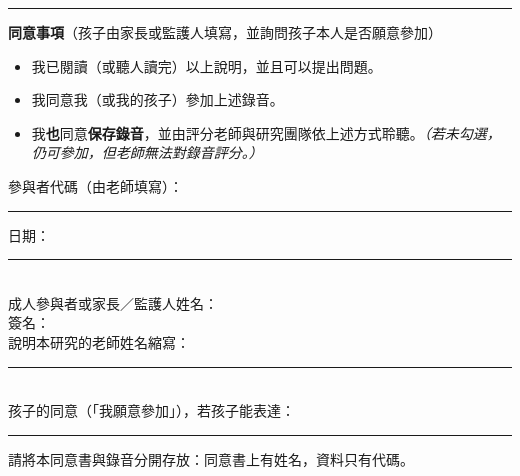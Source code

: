 \documentclass[11pt,a4paper]{article}
\begin{document}
\medskip\hrule\medskip
\textbf{同意事項}（孩子由家長或監護人填寫，並詢問孩子本人是否願意參加）

\begin{itemize}[label=$\square$]
\item 我已閱讀（或聽人讀完）以上說明，並且可以提出問題。
\item 我同意我（或我的孩子）參加上述錄音。
\item 我\textbf{也}同意\textbf{保存錄音}，並由評分老師與研究團隊依上述方式聆聽。\textit{（若未勾選，仍可參加，但老師無法對錄音評分。）}
\end{itemize}

\vspace{6pt}
\noindent 參與者代碼（由老師填寫）：\rule{3.5cm}{0.4pt}\hfill 日期：\rule{4cm}{0.4pt}\\[12pt]
\noindent 成人參與者或家長／監護人姓名：\hrulefill\\[12pt]
\noindent 簽名：\hrulefill\\[12pt]
\noindent 說明本研究的老師姓名縮寫：\rule{3cm}{0.4pt}\\[12pt]
\noindent 孩子的同意（「我願意參加」），若孩子能表達：\rule{4cm}{0.4pt}

\vspace{4pt}\footnotesize 請將本同意書與錄音分開存放：同意書上有姓名，資料只有代碼。
\end{document}
